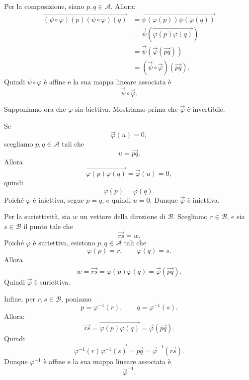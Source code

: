 \documentclass[a4paper]{article}
\begin{document}
\begin{snippetproof}{}
    Per la composizione, siano \(p,q\in\mathcal{A}\). Allora:
    \begin{align*}
        \overrightarrow{(\psi\circ\varphi)(p)(\psi\circ\varphi)(q)}
        &=
        \overrightarrow{\psi(\varphi(p))\psi(\varphi(q))}\\
        &=
        \overrightarrow{\psi}
        \left(
            \overrightarrow{\varphi(p)\varphi(q)}
        \right)\\
        &=
        \overrightarrow{\psi}
        \left(
            \overrightarrow{\varphi}(\overrightarrow{pq})
        \right)\\
        &=
        (\overrightarrow{\psi}\circ\overrightarrow{\varphi})
        (\overrightarrow{pq}).
    \end{align*}
    Quindi \(\psi\circ\varphi\) è affine e la sua mappa lineare associata è
    \[
        \overrightarrow{\psi}\circ\overrightarrow{\varphi}.
    \]

    Supponiamo ora che \(\varphi\) sia biettiva. Mostriamo prima che \(\overrightarrow{\varphi}\) è invertibile.

    Se
    \[
        \overrightarrow{\varphi}(u)=0,
    \]
    scegliamo \(p,q\in\mathcal{A}\) tali che
    \[
        u=\overrightarrow{pq}.
    \]
    Allora
    \[
        \overrightarrow{\varphi(p)\varphi(q)}
        =
        \overrightarrow{\varphi}(u)
        =
        0,
    \]
    quindi
    \[
        \varphi(p)=\varphi(q).
    \]
    Poiché \(\varphi\) è iniettiva, segue \(p=q\), e quindi \(u=0\). Dunque \(\overrightarrow{\varphi}\) è iniettiva.

    Per la suriettività, sia \(w\) un vettore della direzione di \(\mathcal{B}\). Scegliamo \(r\in\mathcal{B}\), e sia \(s\in\mathcal{B}\) il punto tale che
    \[
        \overrightarrow{rs}=w.
    \]
    Poiché \(\varphi\) è suriettiva, esistono \(p,q\in\mathcal{A}\) tali che
    \[
        \varphi(p)=r,
        \qquad
        \varphi(q)=s.
    \]
    Allora
    \[
        w
        =
        \overrightarrow{rs}
        =
        \overrightarrow{\varphi(p)\varphi(q)}
        =
        \overrightarrow{\varphi}(\overrightarrow{pq}).
    \]
    Quindi \(\overrightarrow{\varphi}\) è suriettiva.

    Infine, per \(r,s\in\mathcal{B}\), poniamo
    \[
        p=\varphi^{-1}(r),
        \qquad
        q=\varphi^{-1}(s).
    \]
    Allora:
    \[
        \overrightarrow{rs}
        =
        \overrightarrow{\varphi(p)\varphi(q)}
        =
        \overrightarrow{\varphi}(\overrightarrow{pq}).
    \]
    Quindi
    \[
        \overrightarrow{\varphi^{-1}(r)\varphi^{-1}(s)}
        =
        \overrightarrow{pq}
        =
        \overrightarrow{\varphi}^{-1}(\overrightarrow{rs}).
    \]
    Dunque \(\varphi^{-1}\) è affine e la sua mappa lineare associata è
    \[
        \overrightarrow{\varphi}^{-1}.
    \]
\end{snippetproof}
\end{document}
